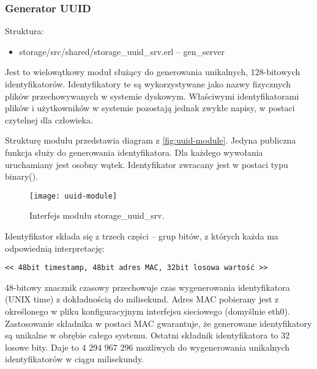 \subsubsection{Generator UUID}
Struktura:
\begin{itemize}
	\item storage/src/shared/storage\_uuid\_srv.erl – gen\_server
\end{itemize}

Jest to wielowątkowy moduł służący do generowania unikalnych, 128-bitowych identyfikatorów. Identyfikatory te są wykorzystywane jako nazwy fizycznych plików przechowywanych w systemie dyskowym. Właściwymi identyfikatorami plików i użytkowników w systemie pozostają jednak zwykłe napisy, w postaci czytelnej dla człowieka.

Strukturę modułu przedstawia diagram z \autoref{fig:uuid-module}. Jedyna publiczna funkcja służy do generowania identyfikatora. Dla każdego wywołania uruchamiany jest osobny wątek. Identyfikator zwracany jest w postaci typu binary().

\begin{figure}[!htbp]
	\centering
	\texttt{[image: uuid-module]}
	\caption{Interfejs modułu storage\_uuid\_srv.}
	\label{fig:uuid-module}
\end{figure}

Identyfikator składa się z trzech części – grup bitów, z których każda ma odpowiednią interpretację:

\centerline{\texttt{<< 48bit timestamp, 48bit adres MAC, 32bit losowa wartość >>}}

48-bitowy znacznik czasowy przechowuje czas wygenerowania identyfikatora (UNIX time) z dokładnością do milisekund. Adres MAC pobierany jest z określonego w pliku konfiguracyjnym interfejsu sieciowego (domyślnie eth0). Zastosowanie składnika w postaci MAC gwarantuje, że generowane identyfikatory są unikalne w obrębie całego systemu. Ostatni składnik identyfikatora to 32 losowe bity. Daje to 4 294 967 296 możliwych do wygenerowania unikalnych identyfikatorów w ciągu milisekundy.